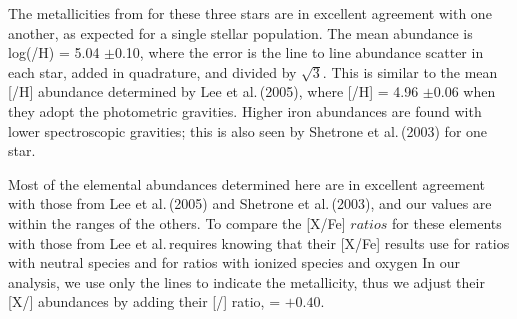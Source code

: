 \documentclass{emulateapj}
\newcommand\etal{{\rm et al.\,}}
\begin{document}
The metallicities from  for these three stars are in 
excellent agreement with one another, as expected for a single 
stellar population.  The mean  abundance is 
log(/H) = 5.04 $\pm$0.10, where the error is the 
line to line abundance scatter in each star, added in quadrature,
and divided by $\sqrt{3}$.
This is similar to the mean [/H] 
abundance determined by Lee \etal (2005), where 
[/H] = 4.96 $\pm$0.06
when they adopt the photometric gravities.
Higher iron abundances are found with lower spectroscopic gravities;
this is also seen by Shetrone \etal (2003) for one star.

Most of the elemental abundances determined here are in 
excellent agreement with those from Lee \etal (2005) and 
Shetrone \etal (2003), and our  values are 
within the ranges of the others.
%
To compare the [X/Fe] $ratios$ for these elements with those 
from Lee \etal  requires knowing that their [X/Fe] results use 
  for ratios with neutral species and  
for ratios with ionized species and 
oxygen
In our analysis, we use only the  lines to indicate the
metallicity, thus we adjust their [X/] abundances by adding
their [/] ratio, = $+0.40$.
\end{document}
